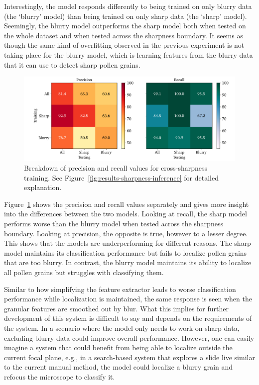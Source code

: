 Interestingly, the model responds differently to being trained on only blurry data (the `blurry' model) than being trained on only sharp data (the `sharp' model).
Seemingly, the blurry model outperforms the sharp model both when tested on the whole dataset and when tested across the sharpness boundary.
It seems as though the same kind of overfitting observed in the previous experiment is not taking place for the blurry model, which is learning features from the blurry data that it can use to detect sharp pollen grains.

\begin{figure}[htbp]
  \centering
  \includegraphics[width=\textwidth]{figs/results/sharpness/confustion_balanced_test_dual.pdf}
  \caption[Precision and recall across sharpness boundary]{%
Breakdown of precision and recall values for cross-sharpness training. See Figure~\ref{fig:results-sharpness-inference} for detailed explanation.
  }\label{fig:results-sharpness-pr-rec}
\end{figure}

Figure~\ref{fig:results-sharpness-pr-rec} shows the precision and recall values separately and gives more insight into the differences between the two models.
Looking at recall, the sharp model performs worse than the blurry model when tested across the sharpness boundary.
Looking at precision, the opposite is true, however to a lesser degree.
This shows that the models are underperforming for different reasons.
The sharp model maintains its classification performance but fails to localize pollen grains that are too blurry. In contrast, the blurry model maintains its ability to localize all pollen grains but struggles with classifying them.

Similar to how simplifying the feature extractor leads to worse classification performance while localization is maintained, the same response is seen when the granular features are smoothed out by blur.
What this implies for further development of this system is difficult to say and depends on the requirements of the system.
In a scenario where the model only needs to work on sharp data, excluding blurry data could improve overall performance.
However, one can easily imagine a system that could benefit from being able to localize outside the current focal plane, e.g., in a search-based system that explores a slide live similar to the current manual method, the model could localize a blurry grain and refocus the microscope to classify it.

